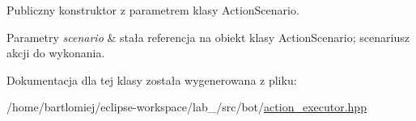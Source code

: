 Publiczny konstruktor z parametrem klasy Action\+Scenario. 


\begin{DoxyParams}{Parametry}
{\em scenario} & stała referencja na obiekt klasy Action\+Scenario; scenariusz akcji do wykonania. \\
\hline
\end{DoxyParams}


Dokumentacja dla tej klasy została wygenerowana z pliku\+:\begin{DoxyCompactItemize}
\item 
/home/bartlomiej/eclipse-\/workspace/lab\+\_/src/bot/\hyperlink{action__executor_8hpp}{action\+\_\+executor.\+hpp}\end{DoxyCompactItemize}
